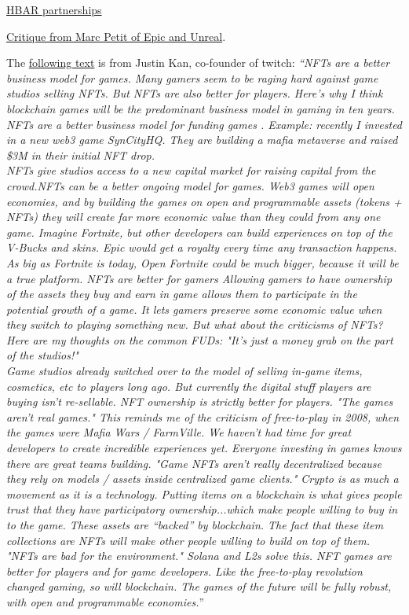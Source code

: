 \href{https://www.prnewswire.com/news-releases/hbar-foundation-and-ubisoft-partner-to-support-growth-of-gaming-on-hedera-network-301474971.html}{HBAR partnerships}\par
\href{https://finance.yahoo.com/news/epic-games-vp-people-have-lost-interest-in-the-metaverse-200725562.html}{Critique from Marc Petit of Epic and Unreal}.\par
The \href{https://twitter.com/justinkan/status/1491270239967154178}{following text} is from Justin Kan, co-founder of twitch: \textit{``NFTs are a better business model for games. Many gamers seem to be raging hard against game studios selling NFTs. But NFTs are also better for players. Here’s why I think blockchain games will be the predominant business model in gaming in ten years. NFTs are a better business model for funding games . Example: recently I invested in a new web3 game SynCityHQ. They are building a mafia metaverse and raised \$3M in their initial NFT drop.\\ NFTs give studios access to a new capital market for raising capital from the crowd.NFTs can be a better ongoing model for games. Web3 games will open economies, and by building the games on open and programmable assets (tokens + NFTs) they will create far more economic value than they could from any one game. Imagine Fortnite, but other developers can build experiences on top of the V-Bucks and skins. Epic would get a royalty every time any transaction happens. As big as Fortnite is today, Open Fortnite could be much bigger, because it will be a true platform. NFTs are better for gamers Allowing gamers to have ownership of the assets they buy and earn in game allows them to participate in the potential growth of a game. It lets gamers preserve some economic value when they switch to playing something new. But what about the criticisms of NFTs?\\
Here are my thoughts on the common FUDs: "It’s just a money grab on the part of the studios!"\\
Game studios already switched over to the model of selling in-game items, cosmetics, etc to players long ago. But currently the digital stuff players are buying isn’t re-sellable. NFT ownership is strictly better for players. "The games aren’t real games." This reminds me of the criticism of free-to-play in 2008, when the games were Mafia Wars / FarmVille. We haven’t had time for great developers to create incredible experiences yet. Everyone investing in games knows there are great teams building. "Game NFTs aren’t really decentralized because they rely on models / assets inside centralized game clients."
Crypto is as much a movement as it is a technology. Putting items on a blockchain is what gives people trust that they have participatory ownership...which make people willing to buy in to the game. These assets are “backed” by blockchain.
The fact that these item collections are NFTs will make other people willing to build on top of them. "NFTs are bad for the environment." Solana and L2s solve this. NFT games are better for players and for game developers. Like the free-to-play revolution changed gaming, so will blockchain. The games of the future will be fully robust, with open and programmable economies.}''
